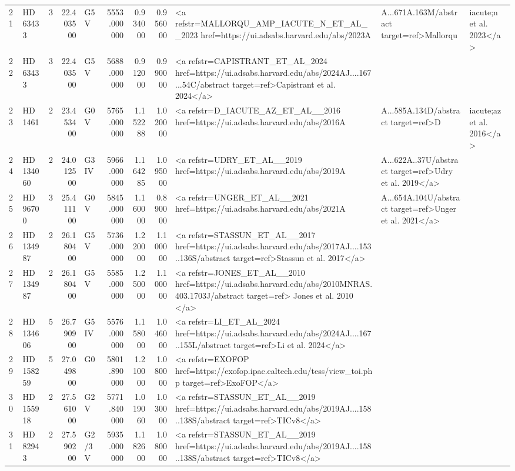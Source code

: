 \begin{tabular}{llrrlrrrl}
21 & HD 63433 & 3 & 22.403500 & G5 V & 5553.000000 & 0.934000 & 0.956000 & <a refstr=MALLORQU_AMP_IACUTE_N_ET_AL__2023 href=https://ui.adsabs.harvard.edu/abs/2023A&A...671A.163M/abstract target=ref>Mallorqu&iacute;n et al. 2023</a> \\
22 & HD 63433 & 3 & 22.403500 & G5 V & 5688.000000 & 0.912000 & 0.990000 & <a refstr=CAPISTRANT_ET_AL_2024 href=https://ui.adsabs.harvard.edu/abs/2024AJ....167...54C/abstract target=ref>Capistrant et al. 2024</a> \\
23 & HD 1461 & 2 & 23.453400 & G0 V & 5765.000000 & 1.152288 & 1.020000 & <a refstr=D_IACUTE_AZ_ET_AL__2016 href=https://ui.adsabs.harvard.edu/abs/2016A&A...585A.134D/abstract target=ref>D&iacute;az et al. 2016</a> \\
24 & HD 134060 & 2 & 24.012500 & G3 IV & 5966.000000 & 1.164285 & 1.095000 & <a refstr=UDRY_ET_AL__2019 href=https://ui.adsabs.harvard.edu/abs/2019A&A...622A..37U/abstract target=ref>Udry et al. 2019</a> \\
25 & HD 96700 & 3 & 25.411100 & G0 V & 5845.000000 & 1.160000 & 0.890000 & <a refstr=UNGER_ET_AL__2021 href=https://ui.adsabs.harvard.edu/abs/2021A&A...654A.104U/abstract target=ref>Unger et al. 2021</a> \\
26 & HD 134987 & 2 & 26.180400 & G5 V & 5736.000000 & 1.220000 & 1.100000 & <a refstr=STASSUN_ET_AL__2017 href=https://ui.adsabs.harvard.edu/abs/2017AJ....153..136S/abstract target=ref>Stassun et al. 2017</a> \\
27 & HD 134987 & 2 & 26.180400 & G5 V & 5585.000000 & 1.250000 & 1.100000 & <a refstr=JONES_ET_AL__2010 href=https://ui.adsabs.harvard.edu/abs/2010MNRAS.403.1703J/abstract target=ref> Jones et al. 2010 </a> \\
28 & HD 134606 & 5 & 26.790900 & G5IV & 5576.000000 & 1.158000 & 1.046000 & <a refstr=LI_ET_AL_2024 href=https://ui.adsabs.harvard.edu/abs/2024AJ....167..155L/abstract target=ref>Li et al. 2024</a> \\
29 & HD 158259 & 5 & 27.049800 & G0 & 5801.890000 & 1.210000 & 1.080000 & <a refstr=EXOFOP href=https://exofop.ipac.caltech.edu/tess/view_toi.php target=ref>ExoFOP</a> \\
30 & HD 155918 & 2 & 27.561000 & G2V & 5771.840000 & 1.019060 & 1.030000 & <a refstr=STASSUN_ET_AL__2019 href=https://ui.adsabs.harvard.edu/abs/2019AJ....158..138S/abstract target=ref>TICv8</a> \\
31 & HD 82943 & 2 & 27.590200 & G2/3V & 5935.000000 & 1.182600 & 1.080000 & <a refstr=STASSUN_ET_AL__2019 href=https://ui.adsabs.harvard.edu/abs/2019AJ....158..138S/abstract target=ref>TICv8</a> \\

\end{tabular}
